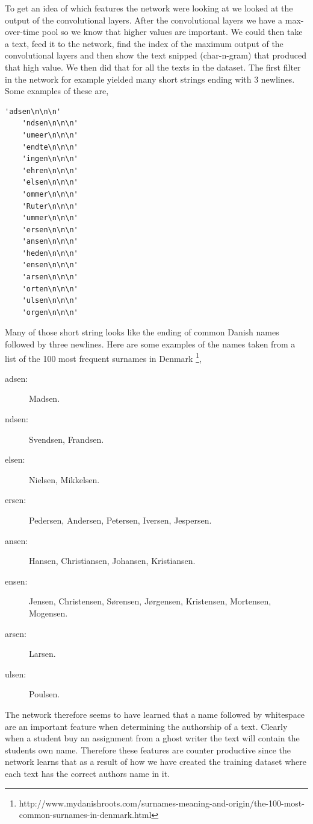To get an idea of which features the network were looking at we looked at the
output of the convolutional layers. After the convolutional layers we have a
max-over-time pool so we know that higher values are important. We could then
take a text, feed it to the network, find the index of the maximum output of
the convolutional layers and then show the text snipped (char-n-gram) that
produced that high value. We then did that for all the texts in the dataset. The
first filter in the network for example yielded many short strings ending with 3
newlines. Some examples of these are,

\begin{lstlisting}[gobble=4]
    'adsen\n\n\n'
    'ndsen\n\n\n'
    'umeer\n\n\n'
    'endte\n\n\n'
    'ingen\n\n\n'
    'ehren\n\n\n'
    'elsen\n\n\n'
    'ommer\n\n\n'
    'Ruter\n\n\n'
    'ummer\n\n\n'
    'ersen\n\n\n'
    'ansen\n\n\n'
    'heden\n\n\n'
    'ensen\n\n\n'
    'arsen\n\n\n'
    'orten\n\n\n'
    'ulsen\n\n\n'
    'orgen\n\n\n'
\end{lstlisting}

Many of those short string looks like the ending of common Danish
names followed by three newlines. Here are some examples of the
names taken from a list of the 100 most frequent surnames in Denmark
\footnote{http://www.mydanishroots.com/surnames-meaning-and-origin/the-100-most-
common-surnames-in-denmark.html},

\begin{description}
    \item[adsen:] Madsen.
    \item[ndsen:] Svendsen, Frandsen.
    \item[elsen:] Nielsen, Mikkelsen.
    \item[ersen:] Pedersen, Andersen, Petersen, Iversen, Jespersen.
    \item[ansen:] Hansen, Christiansen, Johansen, Kristiansen.
    \item[ensen:] Jensen, Christensen, S\o rensen, J\o rgensen, Kristensen,
        Mortensen, Mogensen.
    \item[arsen:] Larsen.
    \item[ulsen:] Poulsen.
\end{description}

The network therefore seems to have learned that a name followed by whitespace
are an important feature when determining the authorship of a text. Clearly when
a student buy an assignment from a ghost writer the text will contain the
students own name. Therefore these features are counter productive since the
network learns that as a result of how we have created the training dataset
where each text has the correct authors name in it.

